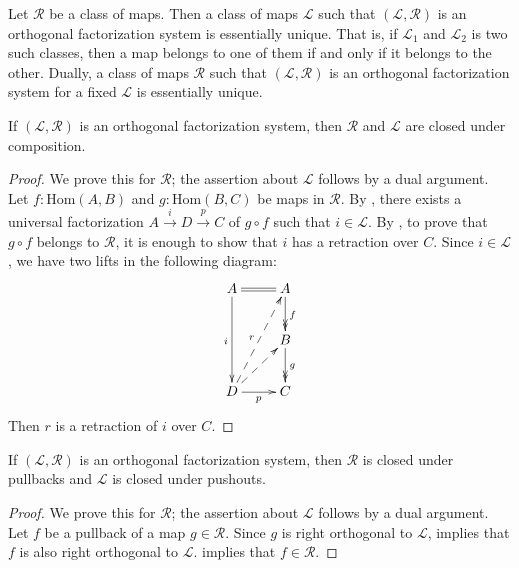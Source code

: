 \documentclass[reqno]{amsart}
\theoremstyle{definition}
\theoremstyle{remark}
\newcommand{\fs}[1]{\mathrm{#1}}
\newcommand{\Hom}{\fs{Hom}}
\numberwithin{figure}{section}
\begin{document}
\begin{cor}
Let $\mathcal{R}$ be a class of maps.
Then a class of maps $\mathcal{L}$ such that $(\mathcal{L},\mathcal{R})$ is an orthogonal factorization system is essentially unique.
That is, if $\mathcal{L}_1$ and $\mathcal{L}_2$ is two such classes, then a map belongs to one of them if and only if it belongs to the other.
Dually, a class of maps $\mathcal{R}$ such that $(\mathcal{L},\mathcal{R})$ is an orthogonal factorization system for a fixed $\mathcal{L}$ is essentially unique.
\end{cor}

\begin{prop}
If $(\mathcal{L},\mathcal{R})$ is an orthogonal factorization system, then $\mathcal{R}$ and $\mathcal{L}$ are closed under composition.
\end{prop}
\begin{proof}
We prove this for $\mathcal{R}$; the assertion about $\mathcal{L}$ follows by a dual argument.
Let $f : \Hom(A,B)$ and $g : \Hom(B,C)$ be maps in $\mathcal{R}$.
By , there exists a universal factorization $A \xrightarrow{i} D \xrightarrow{p} C$ of $g \circ f$ such that $i \in \mathcal{L}$.
By , to prove that $g \circ f$ belongs to $\mathcal{R}$, it is enough to show that $i$ has a retraction over $C$.
Since $i \in \mathcal{L}$, we have two lifts in the following diagram:
\[ \xymatrix{ A \ar@{=}[r] \ar[dd]_i                    & A \ar@{->>}[d]^f \\
                                                        & B \ar@{->>}[d]^g \\
              D \ar[r]_p \ar@{-->}[ur] \ar@{-->}[uur]^r & C
            } \]
Then $r$ is a retraction of $i$ over $C$.
\end{proof}

\begin{prop}
If $(\mathcal{L},\mathcal{R})$ is an orthogonal factorization system, then $\mathcal{R}$ is closed under pullbacks and $\mathcal{L}$ is closed under pushouts.
\end{prop}
\begin{proof}
We prove this for $\mathcal{R}$; the assertion about $\mathcal{L}$ follows by a dual argument.
Let $f$ be a pullback of a map $g \in \mathcal{R}$.
Since $g$ is right orthogonal to $\mathcal{L}$,  implies that $f$ is also right orthogonal to $\mathcal{L}$.
 implies that $f \in \mathcal{R}$.
\end{proof}
\end{document}
